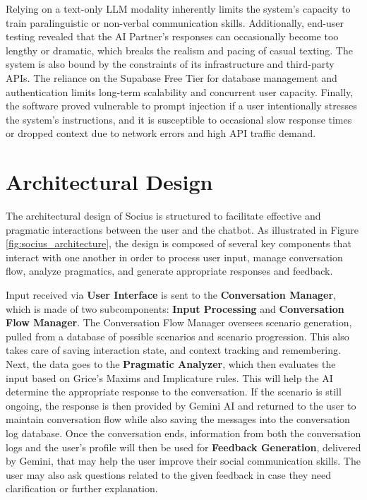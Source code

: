     Relying on a text-only LLM modality inherently limits the system's capacity to train paralinguistic or non-verbal communication skills. Additionally, end-user testing revealed that the AI Partner's responses can occasionally become too lengthy or dramatic, which breaks the realism and pacing of casual texting. The system is also bound by the constraints of its infrastructure and third-party APIs. The reliance on the Supabase Free Tier for database management and authentication limits long-term scalability and concurrent user capacity. Finally, the software proved vulnerable to prompt injection if a user intentionally stresses the system's instructions, and it is susceptible to occasional slow response times or dropped context due to network errors and high API traffic demand.


    {\section{Architectural Design}}
    The architectural design of Socius is structured to facilitate effective and pragmatic interactions between the user and the chatbot. 
    As illustrated in Figure \ref{fig:socius_architecture}, the design is composed of several key components that interact with one another in order to process user input, manage 
    conversation flow, analyze pragmatics, and generate appropriate responses and feedback.

    Input received via \textbf{User Interface} is sent to the \textbf{Conversation Manager}, which is made of two subcomponents: \textbf{Input Processing} and \textbf{Conversation Flow Manager}. The Conversation Flow Manager oversees scenario generation, pulled from a database of possible scenarios and scenario progression. This also takes care of saving interaction state, and context tracking and remembering. Next, the data goes to the \textbf{Pragmatic Analyzer}, which then evaluates the input based on Grice’s Maxims and Implicature rules. This will help the AI determine the appropriate response to the conversation. If the scenario is still ongoing, the response is then provided by Gemini AI and returned to the user to maintain conversation flow while also saving the messages into the conversation log database. Once the conversation ends, information from both the conversation logs and the user’s profile will then be used for \textbf{Feedback Generation}, delivered by Gemini, that may help the user improve their social communication skills. The user may also ask questions related to the given feedback in case they need clarification or further explanation.

